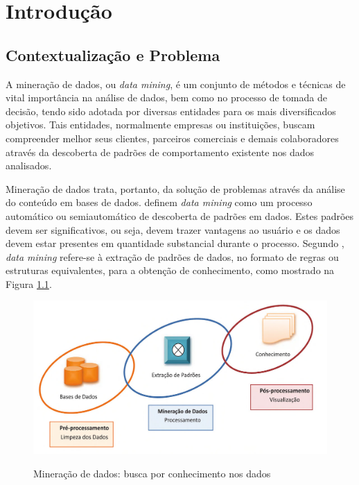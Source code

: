 

\newpage

\chapter{Introdução}
\label{cha:intro}

\markright{}

\section{Contextualização e Problema}
\label{sec:context-problema}

A mineração de dados, ou \textit{data mining}, é um conjunto de métodos e técnicas de vital importância na análise de dados, bem como no processo de tomada de decisão, tendo sido adotada por diversas entidades para os mais diversificados objetivos. Tais entidades, normalmente empresas ou instituições,  buscam compreender melhor seus clientes, parceiros comerciais e demais colaboradores através da descoberta de padrões de comportamento existente nos dados analisados.

Mineração de dados trata, portanto, da solução de problemas através da análise do conteúdo em  bases de dados.  definem \textit{data mining} como um processo automático ou semiautomático de descoberta de padrões em dados. Estes padrões devem ser significativos, ou seja, devem trazer vantagens ao usuário e os dados devem estar presentes em quantidade substancial durante o processo. Segundo , \textit{data mining} refere-se à extração de padrões de dados, no formato de regras ou estruturas equivalentes, para a obtenção de conhecimento, como mostrado na Figura \ref{fig:data-mining}.

\begin{figure}[H]
    \centering
    \caption{Mineração de dados: busca por conhecimento nos dados}
    \includegraphics[width=0.8\linewidth]{figuras/data-mining.PNG}
    \label{fig:data-mining}
\end{figure}

